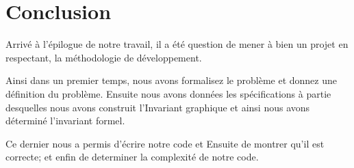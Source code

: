 \section{Conclusion}\label{conclusion}


\begin{flushleft}
\begingroup
\quad\quad Arrivé à l'épilogue de notre travail, il a été question de mener à bien un projet en respectant,
la méthodologie de développement.
\endgroup
\par 
\begingroup
\quad\quad Ainsi dans un premier temps, nous avons formalisez le problème 
et donnez une définition du problème. Ensuite nous avons données les spécifications à partie desquelles
nous avons construit l'Invariant graphique et ainsi nous avons déterminé l'invariant formel.
\endgroup
\par 
\begingroup
\quad\quad Ce dernier nous a permis d'écrire notre code et Ensuite de montrer qu'il est correcte; et enfin de 
determiner la complexité de notre code.
\endgroup
\end{flushleft}